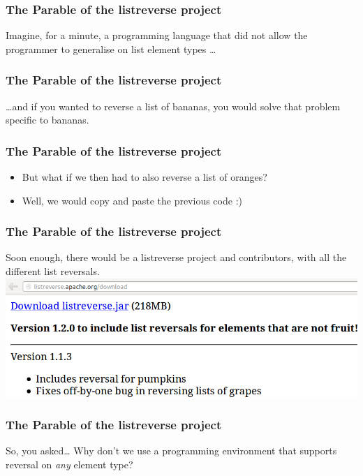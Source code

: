 \begin{frame}
\frametitle{The Parable of the listreverse project}
\begin{center}
Imagine, for a minute, a programming language that did not allow the programmer to generalise on list element types \ldots
\end{center}
\end{frame}

\begin{frame}
\frametitle{The Parable of the listreverse project}
\begin{center}
\ldots and if you wanted to reverse a list of bananas, you would solve that problem specific to bananas. 
\end{center}
\end{frame}

\begin{frame}[fragile]
\frametitle{The Parable of the listreverse project}
\begin{itemize}
\item<1-> But what if we then had to also reverse a list of oranges?
\item<2-> Well, we would copy and paste the previous code :)
\end{itemize}
\end{frame}

\begin{frame}
\frametitle{The Parable of the listreverse project}
Soon enough, there would be a listreverse project and contributors, with all the different list reversals.
\vfill
\includegraphics[height=0.3\textheight,natwidth=840,natheight=285]{image/listreverse.png}
\end{frame}

\begin{frame}
\frametitle{The Parable of the listreverse project}
\begin{block}{So, you asked\ldots}
Why don't we use a programming environment that supports reversal on \emph{any} element type?
\end{block}
\end{frame}

